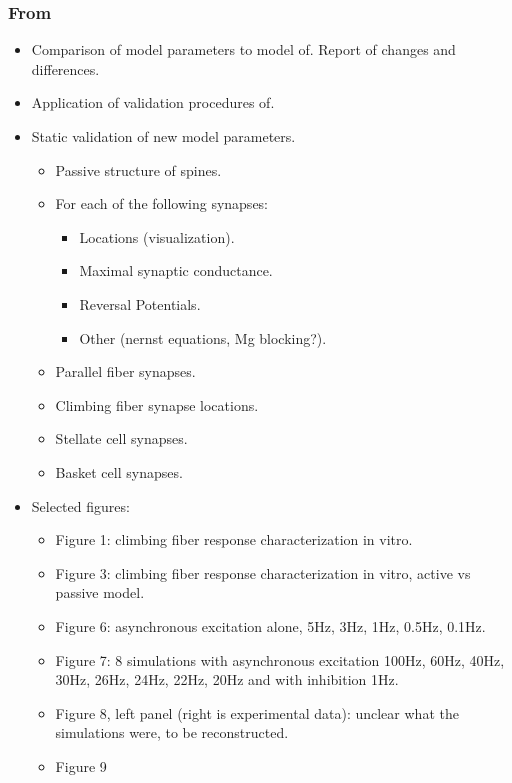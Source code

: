 \documentclass[12pt]{article}
\begin{document}
\subsubsection*{From~\cite{E:1994hc}}

\begin{itemize}
\item Comparison of model parameters to model
  of\cite{De-Schutter-E:1994vn}.  Report of changes and differences.
\item Application of validation procedures
  of\cite{De-Schutter-E:1994vn}.
\item Static validation of new model parameters.
  \begin{itemize}
  \item Passive structure of spines.
  \item For each of the following synapses:
    \begin{itemize}
    \item Locations (visualization).
    \item Maximal synaptic conductance.
    \item Reversal Potentials.
    \item Other (nernst equations, Mg blocking?).
    \end{itemize}
  \item Parallel fiber synapses.
  \item Climbing fiber synapse locations.
  \item Stellate cell synapses.
  \item Basket cell synapses.
  \end{itemize}
\item Selected figures:
  \begin{itemize}
  \item Figure 1: climbing fiber response characterization in vitro.
  \item Figure 3: climbing fiber response characterization in vitro,
    active vs passive model.
  \item Figure 6: asynchronous excitation alone, 5Hz, 3Hz, 1Hz, 0.5Hz,
    0.1Hz.
  \item Figure 7: 8 simulations with asynchronous excitation 100Hz,
    60Hz, 40Hz, 30Hz, 26Hz, 24Hz, 22Hz, 20Hz and with inhibition 1Hz.
  \item Figure 8, left panel (right is experimental data): unclear
    what the simulations were, to be reconstructed.
  \item Figure 9
    \begin{itemize}

\end{itemize}
\end{itemize}
\end{itemize}
\end{document}

